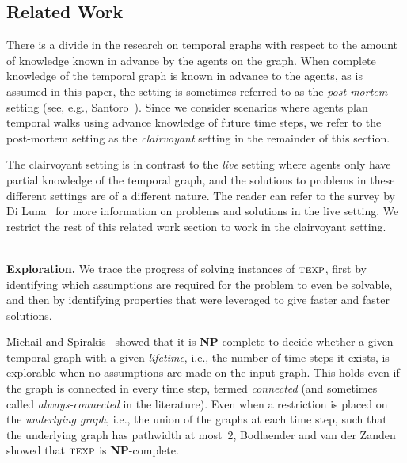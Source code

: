 \documentclass[10pt,a4paper]{article}
\newcommand{\texp}{\textsc{texp}}
\begin{document}
\subsection{Related Work}
\label{subsec:related-work}

There is a divide in the research on temporal graphs with respect to the
amount of knowledge known in advance by the agents on the graph.  When
complete knowledge of the temporal graph is known in advance to the agents,
as is assumed in this paper, the setting is
sometimes referred to as the \emph{post-mortem}
setting (see, e.g., Santoro~\cite{Santoro15}). Since we consider
scenarios where agents plan temporal walks using advance knowledge
of future time steps, we refer to the post-mortem
setting as the {\em clairvoyant} setting in the remainder of this section.

The clairvoyant setting is in contrast to the \emph{live} setting where agents only have partial
knowledge of the temporal graph, and the solutions to problems in these
different settings are of a different nature.  The reader can refer to the
survey by Di Luna~\cite{DiLuna19} for more information on problems and
solutions in the live setting.  We restrict the rest of this related work
section to work in the clairvoyant setting.


~\\ \noindent \textbf{Exploration.} 
%
%
We trace the progress of solving instances of $\texp$, first by identifying
which assumptions are required for the problem to even be solvable, and then by
identifying properties that were leveraged to give faster and faster solutions. 

Michail and Spirakis~\cite{MichailS14,MichailS16} showed that it is
\textbf{NP}-complete to decide whether a given temporal graph with a given
\textit{lifetime}, i.e., the number of time steps it exists, is explorable when
no assumptions are made on the input graph. This holds even if the graph is connected in
every time step, termed \textit{connected} (and sometimes called \emph{always-connected}
in the literature).
Even when a restriction is placed on the \textit{underlying graph}, i.e., the
union of the graphs at each time step, such that the underlying graph has
pathwidth at most~$2$, Bodlaender and van der Zanden~\cite{BodlaenderV19} showed
that $\texp$ is \textbf{NP}-complete. 
\end{document}
